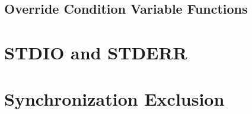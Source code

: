 \subsection{Override Condition Variable Functions}

\section{STDIO and STDERR}

\section{Synchronization Exclusion}
